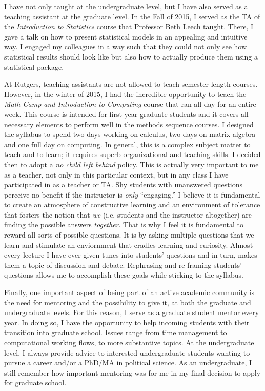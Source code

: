 \documentclass[11pt]{letter} %
\begin{document}
\begin{letter}{}
I have not only taught at the undergraduate level, but I have also served as a teaching assistant at the graduate level. In the Fall of 2015, I served as the TA of the \emph{Introduction to Statistics} course that Professor Beth Leech taught. There, I gave a talk on how to present statistical models in an appealing and intuitive way. I engaged my colleagues in a way such that they could not only see how statistical results should look like but also how to actually produce them using a statistical package. 

At Rutgers, teaching assistants are not allowed to teach semester-length courses. However, in the winter of 2015, I had the incredible opportunity to teach the \emph{Math Camp and Introduction to Computing} course that ran all day for an entire week. This course is intended for first-year graduate students and it covers all necessary elements to perform well in the methods sequence courses. I designed the \href{https://github.com/hbahamonde/Math-Camp/raw/master/Syllabus/Math_Camp_Syllabus.pdf}{syllabus} to spend two days working on calculus, two days on matrix algebra and one full day on computing. In general, this is a complex subject matter to teach and to learn; it requires superb organizational and teaching skills. I decided then to adopt a \emph{no child left behind} policy. This is actually very important to me as a teacher, not only in this particular context, but in any class I have participated in as a teacher or TA. Shy students with unanswered questions perceive no benefit if the instructor is \emph{only} ``engaging.'' I believe it is fundamental to create an atmosphere of constructive learning and an environment of tolerance that fosters the notion that \emph{we} (i.e, students and the instructor altogether) are finding the possible answers \emph{together}. That is why I feel it is fundamental to reward all sorts of possible questions. It is by asking multiple questions that we learn and stimulate an enviornment that cradles learning and curiosity. Almost every lecture I have ever given tunes into students' questions and in turn, makes them a topic of discussion and debate. Rephrasing and re-framing students' questions allows me to accomplish these goals while sticking to the syllabus. 

Finally, one important aspect of being part of an active academic community is the need for mentoring and the possibility to give it, at both the graduate and undergraduate levels. For this reason, I serve as a graduate student mentor every year. In doing so, I have the opportunity to help incoming students with their transition into graduate school. Issues range from time management to computational working flows, to more substantive topics. At the undergraduate level, I always provide advice to interested undergraduate students wanting to pursue a career and/or a PhD/MA in political science. As an undergraduate, I still remember how important mentoring was for me in my final decision to apply for graduate school.


\end{letter}
\end{document}
